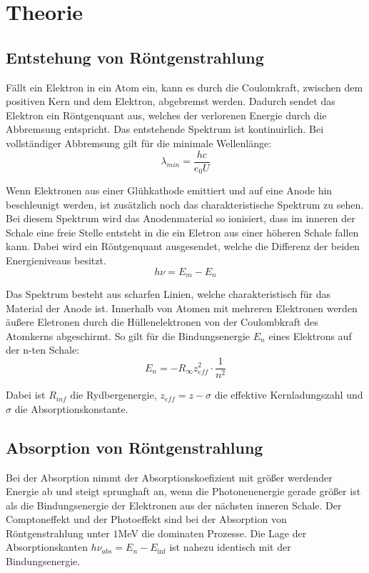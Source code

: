 \section{Theorie}
\label{sec:Theorie}

\subsection{Entstehung von Röntgenstrahlung}

Fällt ein Elektron in ein Atom ein, kann es durch die Coulomkraft, zwischen dem positiven Kern
und dem Elektron, abgebremst werden. Dadurch sendet das Elektron ein Röntgenquant  aus, welches der
verlorenen Energie durch die Abbremsung entspricht. Das entstehende Spektrum ist kontinuirlich.
Bei vollständiger Abbremsung gilt für die minimale Wellenlänge:
\begin{equation}
  \lambda_{min} = \frac{h c}{e_0 U}
\end{equation}

Wenn Elektronen aus einer Glühkathode emittiert und auf eine Anode hin beschleunigt werden, ist zusätzlich
noch das charakteristische Spektrum zu sehen. Bei diesem Spektrum wird das Anodenmaterial so ionisiert, dass im inneren
der Schale eine freie Stelle entsteht in die ein Eletron aus einer höheren Schale fallen kann. Dabei wird
ein Röntgenquant ausgesendet, welche die Differenz der beiden Energieniveaus besitzt.
\begin{equation}
  h \nu = E_m - E_n
\end{equation}

Das Spektrum besteht aus scharfen Linien, welche charakteristisch für das Material der Anode ist.
Innerhalb von Atomen mit mehreren Elektronen werden äußere Eletronen durch die Hüllenelektronen von
der Coulombkraft des Atomkerns abgeschirmt.
So gilt für die Bindungsenergie $E_n$ eines Elektrons auf der n-ten Schale:
\begin{equation}
  E_n = -R_{\infty} z_{eff}^2 \cdot \frac{1}{n^2}
\end{equation}

Dabei ist $R_{inf}$ die Rydbergenergie, $z_{eff} = z - \sigma$ die effektive Kernladungszahl und $\sigma$ die Absorptionskonstante.

\subsection{Absorption von Röntgenstrahlung}
Bei der Absorption nimmt der Absorptionskoefizient mit größer werdender Energie ab und steigt sprunghaft an, wenn
die Photonenenergie gerade größer ist als die Bindungsenergie der Elektronen aus der nächsten inneren Schale. Der
Comptoneffekt und der Photoeffekt sind bei der Absorption von Röntgenstrahlung unter $1$MeV die dominaten Prozesse.
Die Lage der Absorptionskanten $h \nu_{abs} = E_n - E_{\inf}$ ist nahezu identisch mit der Bindungsenergie.

